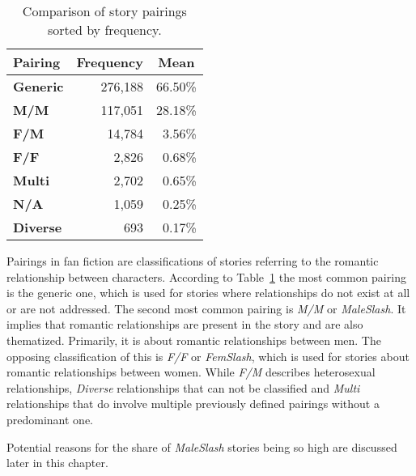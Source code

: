 
\begin{table}[htb]
    \renewcommand{\arraystretch}{1.5}
    \centering
    \begin{tabular}{lrr}
        \toprule
        \textbf{Pairing} &
        \multicolumn{1}{c}{\textbf{Frequency}} &
        \multicolumn{1}{c}{\textbf{Mean}} \\
        \midrule
        \textbf{Generic} & 276,188 & 66.50\% \\
        \textbf{M/M}     & 117,051 & 28.18\% \\
        \textbf{F/M}     & 14,784  & 3.56\%  \\
        \textbf{F/F}     & 2,826   & 0.68\%  \\
        \textbf{Multi}   & 2,702   & 0.65\%  \\
        \textbf{N/A}     & 1,059   & 0.25\%  \\
        \textbf{Diverse}   & 693     & 0.17\%  \\
        \bottomrule
    \end{tabular}
    \caption{Comparison of story pairings sorted by frequency.}
    \label{tab:story-pairings}
\end{table}

Pairings in fan fiction are classifications of stories referring to the romantic relationship between characters.
According to Table~\ref{tab:story-pairings} the most common pairing is the generic one, which is used for stories where relationships do not exist at all or are not addressed.
The second most common pairing is \emph{M/M} or \emph{MaleSlash}.
It implies that romantic relationships are present in the story and are also thematized.
Primarily, it is about romantic relationships between men.
The opposing classification of this is \emph{F/F} or \emph{FemSlash}, which is used for stories about romantic relationships between women.
While \emph{F/M} describes heterosexual relationships, \emph{Diverse} relationships that can not be classified and \emph{Multi} relationships that do involve multiple previously defined pairings without a predominant one.

Potential reasons for the share of \emph{MaleSlash} stories being so high are discussed later in this chapter.

